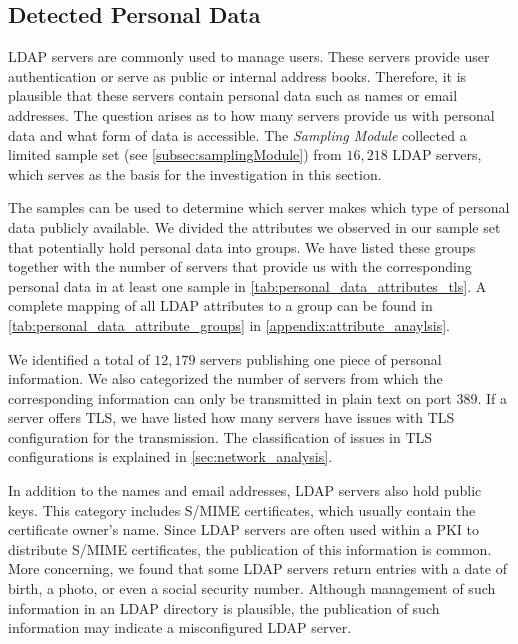 %




\subsection{Detected Personal Data}
\label{sec:personal_data}
LDAP servers are commonly used to manage users. These servers provide user authentication or serve as public or internal address books. Therefore, it is plausible that these servers contain personal data such as names or email addresses. The question arises as to how many servers provide us with personal data and what form of data is accessible. The \emph{Sampling Module} collected a limited sample set (see \cref{subsec:samplingModule}) from $16,218$ LDAP servers, which serves as the basis for the investigation in this section. 

The samples can be used to determine which server makes which type of personal data publicly available. We divided the attributes we observed in our sample set that potentially hold personal data into groups. We have listed these groups together with the number of servers that provide us with the corresponding personal data in at least one sample in \cref{tab:personal_data_attributes_tls}. A complete mapping of all LDAP attributes to a group can be found in \cref{tab:personal_data_attribute_groups} in \cref{appendix:attribute_anaylsis}.

We identified a total of $12,179$ servers publishing one piece of personal information. We also categorized the number of servers from which the corresponding information can only be transmitted in plain text on port 389. If a server offers TLS, we have listed how many servers have issues with TLS configuration for the transmission. The classification of issues in TLS configurations is explained in \cref{sec:network_analysis}.

In addition to the names and email addresses, LDAP servers also hold public keys. This category includes S/MIME certificates, which usually contain the certificate owner's name. Since LDAP servers are often used within a \gls{PKI} to distribute S/MIME certificates, the publication of this information is common. More concerning, we found that some LDAP servers return entries with a date of birth, a photo, or even a social security number. Although management of such information in an LDAP directory is plausible, the publication of such information may indicate a misconfigured LDAP server.

